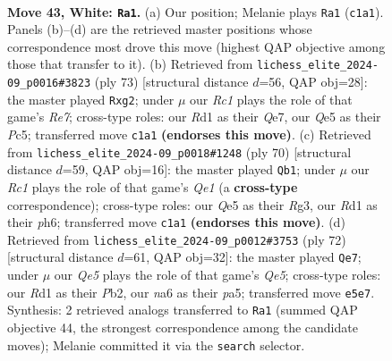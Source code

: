 \documentclass[11pt]{article}
\begin{document}
\clearpage

\begin{figure}[p]\centering
\begin{subfigure}{0.46\textwidth}\centering
\resizebox{\linewidth}{!}{%
\newchessgame
\chessboard[
  setfen={r5k1/pp6/n6q/2pPQp2/8/P5P1/1P3K2/2RR4 w - - 4 43},
  showmover=false,
  pgfstyle=straightmove, color=movearrow, markmove={c1-a1}
]}
\caption{}
\end{subfigure}\hfill
\begin{subfigure}{0.46\textwidth}\centering
\resizebox{\linewidth}{!}{%
\newchessgame
\chessboard[
  setfen={6k1/4qpp1/7p/2pP1P2/5Q2/pPN4P/r3r1P1/5R1K b - - 4 37},
  showmover=false,
  pgfstyle=straightmove, color=movearrow, markmove={e2-g2}
]}
\caption{}
\end{subfigure}
\\[4pt]
\begin{subfigure}{0.46\textwidth}\centering
\resizebox{\linewidth}{!}{%
\newchessgame
\chessboard[
  setfen={4r2k/p2q2p1/5p1p/8/5P2/2P3RP/6P1/4Q2K w - - 1 36},
  showmover=false,
  pgfstyle=straightmove, color=movearrow, markmove={e1-b1}
]}
\caption{}
\end{subfigure}\hfill
\begin{subfigure}{0.46\textwidth}\centering
\resizebox{\linewidth}{!}{%
\newchessgame
\chessboard[
  setfen={k5r1/1p6/2p5/p2pQ3/5K1P/PR6/1P4P1/3q4 w - - 2 37},
  showmover=false,
  pgfstyle=straightmove, color=movearrow, markmove={e5-e7}
]}
\caption{}
\end{subfigure}
\caption{\textbf{Move 43, White: \texttt{Ra1}.} (a) Our position; Melanie plays \texttt{Ra1} (\texttt{c1a1}). Panels (b)--(d) are the retrieved master positions whose correspondence most drove this move (highest QAP objective among those that transfer to it). (b) Retrieved from \texttt{lichess\_elite\_2024-09\_p0016\#3823} (ply 73) [structural distance $d$=56, QAP obj=28]: the master played \texttt{Rxg2}; under $\mu$ our \emph{Rc1} plays the role of that game's \emph{Re7}; cross-type roles: our \emph{R}d1 as their \emph{Q}e7, our \emph{Q}e5 as their \emph{P}c5; transferred move \texttt{c1a1} \textbf{(endorses this move)}. (c) Retrieved from \texttt{lichess\_elite\_2024-09\_p0018\#1248} (ply 70) [structural distance $d$=59, QAP obj=16]: the master played \texttt{Qb1}; under $\mu$ our \emph{Rc1} plays the role of that game's \emph{Qe1} (a \textbf{cross-type} correspondence); cross-type roles: our \emph{Q}e5 as their \emph{R}g3, our \emph{R}d1 as their \emph{p}h6; transferred move \texttt{c1a1} \textbf{(endorses this move)}. (d) Retrieved from \texttt{lichess\_elite\_2024-09\_p0012\#3753} (ply 72) [structural distance $d$=61, QAP obj=32]: the master played \texttt{Qe7}; under $\mu$ our \emph{Qe5} plays the role of that game's \emph{Qe5}; cross-type roles: our \emph{R}d1 as their \emph{P}b2, our \emph{n}a6 as their \emph{p}a5; transferred move \texttt{e5e7}. Synthesis: 2 retrieved analogs transferred to \texttt{Ra1} (summed QAP objective 44, the strongest correspondence among the candidate moves); Melanie committed it via the \texttt{search} selector.}
\label{fig:thought-m84}
\end{figure}
\end{document}
